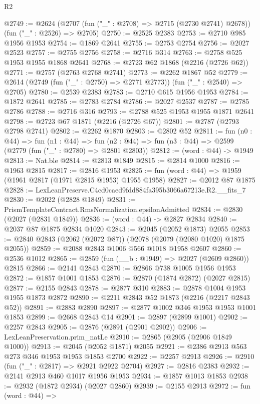 \begin{lexlean}{R2}
\begin{coremodule}
@2749 := @2624 (@2707 (fun ("_" : @2708) => @2715 (@2730 @2741) @2678)) (fun ("_" : @2526) => @2705)
@2750 := @2525 @2383
@2753 := @2710 @985 @1956 @1953
@2754 := @1869 @2641
@2755 := @2753 @2754
@2756 := @2027 @2523
@2757 := @2755 @2756
@2758 := @2716 @314
@2763 := @2758 @525 @1953 @1955 @1868 @2641
@2768 := @2723 @62 @1868 (@2216 (@2726 @62))
@2771 := @2757 (@2763 @2768 @2741)
@2773 := @2262 @1867 @52
@2779 := @2614 (@2749 (fun ("_" : @2750) => @2771 @2773)) (fun ("_" : @2540) => @2705)
@2780 := @2539 @2383
@2783 := @2710 @615 @1956 @1953
@2784 := @1872 @2641
@2785 := @2783 @2784
@2786 := @2027 @2537
@2787 := @2785 @2786
@2788 := @2716 @316
@2793 := @2788 @525 @1953 @1955 @1871 @2641
@2798 := @2723 @67 @1871 (@2216 (@2726 @67))
@2801 := @2787 (@2793 @2798 @2741)
@2802 := @2262 @1870
@2803 := @2802 @52
@2811 := fun (n0 : @44) =>
  fun (n1 : @44) =>
  fun (n2 : @44) => fun (n3 : @44) => @2599 (@2779 (fun ("_" : @2780) => @2801 @2803))
@2812 := (word : @44) -> @1949
@2813 := Nat.ble
@2814 := @2813 @1849
@2815 := @2814 @1000
@2816 := @1963 @2815
@2817 := @2816 @1953
@2825 := fun (word : @44) => @1959 (@1961 @2817 (@1971 @2815 @1953) @1955 @1958)
@2827 := @2012 @87 @1875
@2828 := LexLeanPreserve.C4cd0caed9fdd884fa395b3066a67213e.R2.__fits_7
@2830 := @2022 (@2828 @1849)
@2831 := PrismTemplateContract.RmsNormalization.epsilonAdmitted
@2834 := @2830 (@2027 (@2831 @1849))
@2836 := (word : @44) -> @2827 @2834
@2840 := @2037 @87 @1875 @2834 @1020
@2843 := @2045 (@2052 @1873) @2055
@2853 := @2840 @2843 (@2062 (@2072 @87)) (@2078 (@2079 (@2080 @1020) @1875 @2055))
@2859 := @2088 @2843 @1006 @566 @1018 @1958 @2607
@2860 := @2536 @1012
@2865 := @2859 (fun (__b : @1949) => @2027 (@2609 @2860)) @2815
@2866 := @2141 @2843
@2870 := @2866 @738 @1005 @1956 @1953
@2872 := @1857 @1001 @1853
@2876 := @2870 (@1874 @2872) (@2027 @2815)
@2877 := @2155 @2843
@2878 := @2877 @310
@2883 := @2878 @1004 @1953 @1955 @1873 @2872
@2890 := @2211 @2843 @52 @1873 (@2216 (@2217 @2843 @52))
@2891 := @2883 @2890
@2897 := @2877 @1002 @346 @1953 @1953 @1001 @1853
@2899 := @2668 @2843 @14
@2901 := @2897 (@2899 @1001)
@2902 := @2257 @2843
@2905 := @2876 (@2891 (@2901 @2902))
@2906 := LexLeanPreservation.prim_natLe
@2910 := @2865 (@2905 (@2906 @1849 @1000))
@2913 := @2045 (@2052 @1871) @2055
@2921 := @2386 @2913 @563 @273 @346 @1953 @1953 @1853 @2700
@2922 := @2257 @2913
@2926 := @2910 (fun ("_" : @2817) => @2921 @2922 @2704)
@2927 := @2816 @2383
@2932 := @2141 @2913 @460 @1017 @1956 @1953
@2934 := @1857 @1013 @1853
@2938 := @2932 (@1872 @2934) (@2027 @2860)
@2939 := @2155 @2913
@2972 := fun (word : @44) =>

\end{coremodule}
\end{lexlean}
